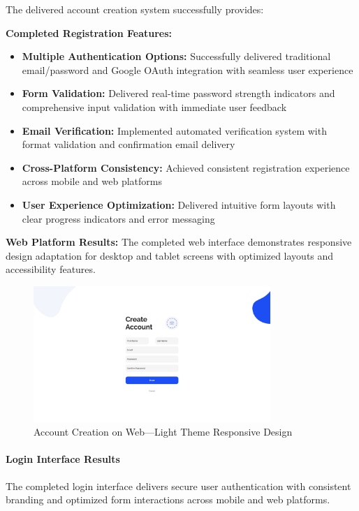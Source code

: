 The delivered account creation system successfully provides:

\textbf{Completed Registration Features:}
\begin{itemize}
    \item \textbf{Multiple Authentication Options:} Successfully delivered traditional email/password and Google OAuth integration with seamless user experience
    \item \textbf{Form Validation:} Delivered real-time password strength indicators and comprehensive input validation with immediate user feedback
    \item \textbf{Email Verification:} Implemented automated verification system with format validation and confirmation email delivery
    \item \textbf{Cross-Platform Consistency:} Achieved consistent registration experience across mobile and web platforms
    \item \textbf{User Experience Optimization:} Delivered intuitive form layouts with clear progress indicators and error messaging
\end{itemize}

\textbf{Web Platform Results:}
The completed web interface demonstrates responsive design adaptation for desktop and tablet screens with optimized layouts and accessibility features.

\begin{figure}[!htbp]
    \centering
    \includegraphics[width=0.8\textwidth]{figures/ui/create_account_web.png}
    \caption{Account Creation on Web---Light Theme Responsive Design}\label{fig:web_account_creation}
\end{figure}

\paragraph{Login Interface Results}
The completed login interface delivers secure user authentication with consistent branding and optimized form interactions across mobile and web platforms.

